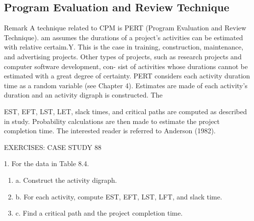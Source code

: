 \documentclass{article}
\begin{document}
\subsection*{Program Evaluation and Review Technique}
Remark A technique related to CPM is PERT (Program Evaluation and Review Technique). am 
assumes the durations of a project's activities can be estimated with relative certaim.Y. 
This is the case in training, construction, maintenance, and advertising projects. Other 
types of projects, such as research projects and computer software development, con-
sist of activities whose durations cannot be estimated with a great degree of certainty. 
PERT considers each activity duration time as a random variable (see Chapter 4). Estimates are made of each activity's duration and an activity digraph is constructed. The 



EST, EFT, LST, LET, slack times, and critical paths are computed as described in study. 
Probability calculations are then made to estimate the project completion time. 
The interested reader is referred to Anderson (1982). 

EXERCISES: CASE STUDY 88 

1. For the data in Table 8.4. 

\begin{enumerate}
\item a. Construct the activity digraph. 
\item b. For each activity, compute EST, EFT, LST, LFT, and slack time. 
\item c. Find a critical path and the project completion time. 
\end{enumerate}
\end{document}

